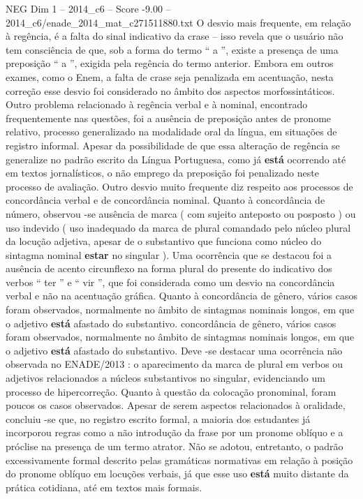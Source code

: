 \begin{textsample}{NEG Dim 1 – 2014\_c6 – Score -9.00 – 2014\_c6/enade\_2014\_mat\_c271511880.txt}
O desvio mais frequente, em relação à regência, é a falta do sinal indicativo da crase – isso revela que o usuário não tem consciência de que, sob a forma do termo “ a ”, existe a presença de uma preposição “ a ”, exigida pela regência do termo anterior.
Embora em outros exames, como o Enem, a falta de crase seja penalizada em acentuação, nesta correção esse desvio foi considerado no âmbito dos aspectos morfossintáticos.
Outro problema relacionado à regência verbal e à nominal, encontrado frequentemente nas questões, foi a ausência de preposição antes de pronome relativo, processo generalizado na modalidade oral da língua, em situações de registro informal.
Apesar da possibilidade de que essa alteração de regência se generalize no padrão escrito da Língua Portuguesa, como já \textbf{está} ocorrendo até em textos jornalísticos, o não emprego da preposição foi penalizado neste processo de avaliação.
Outro desvio muito frequente diz respeito aos processos de concordância verbal e de concordância nominal.
Quanto à concordância de número, observou -se ausência de marca ( com sujeito anteposto ou posposto ) ou uso indevido ( uso inadequado da marca de plural comandado pelo núcleo plural da locução adjetiva, apesar de o substantivo que funciona como núcleo do sintagma nominal \textbf{estar} no singular ).
Uma ocorrência que se destacou foi a ausência de acento circunflexo na forma plural do presente do indicativo dos verbos “ ter ” e “ vir ”, que foi considerada como um desvio na concordância verbal e não na acentuação gráfica.
Quanto à concordância de gênero, vários casos foram observados, normalmente no âmbito de sintagmas nominais longos, em que o adjetivo \textbf{está} afastado do substantivo. concordância de gênero, vários casos foram observados, normalmente no âmbito de sintagmas nominais longos, em que o adjetivo \textbf{está} afastado do substantivo.
Deve -se destacar uma ocorrência não observada no ENADE/2013 : o aparecimento da marca de plural em verbos ou adjetivos relacionados a núcleos substantivos no singular, evidenciando um processo de hipercorreção.
Quanto à questão da colocação pronominal, foram poucos os casos observados.
Apesar de serem aspectos relacionados à oralidade, concluiu -se que, no registro escrito formal, a maioria dos estudantes já incorporou regras como a não introdução da frase por um pronome oblíquo e a próclise na presença de um termo atrator.
Não se adotou, entretanto, o padrão excessivamente formal descrito pelas gramáticas normativas em relação à posição do pronome oblíquo em locuções verbais, já que esse uso \textbf{está} muito distante da prática cotidiana, até em textos mais formais.

\end{textsample}
